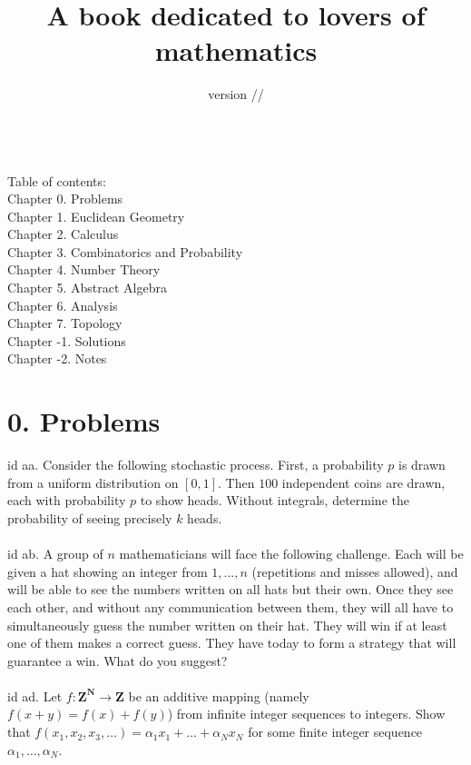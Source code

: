 \documentclass[oneside]{book}
\title{A book dedicated to lovers of mathematics}
\author{}
\date{version \the\year/\the\month/\the\day}
\newcommand{\Z}{\mathbf{Z}}
\newcommand{\N}{\mathbf{N}}
\newcommand\chap[1]{%
  \chapter*{#1}%
  \addcontentsline{toc}{chapter}{#1}}
\begin{document}
\maketitle

\pagestyle{empty}
\tableofcontents

\phantom{}\\
Table of contents:  \\
Chapter 0. Problems   \\
Chapter 1. Euclidean Geometry  \\
Chapter 2. Calculus  \\
Chapter 3. Combinatorics and Probability    \\
Chapter 4. Number Theory \\
Chapter 5. Abstract Algebra    \\
Chapter 6. Analysis  \\
Chapter 7. Topology  \\
Chapter -1. Solutions   \\
Chapter -2. Notes   \\ 

\newpage
\chap{0. Problems}
id aa. Consider the following stochastic process. First, a probability $p$ is drawn from a uniform distribution on $[0,1]$. Then $100$ independent coins are drawn, each with probability $p$ to show heads. Without integrals, determine the probability of seeing precisely $k$ heads.    \\\\


id ab. A group of $n$ mathematicians will face the following challenge. Each will be given a hat showing an integer from $1,\dots,n$ (repetitions and misses allowed), and will be able to see the numbers written on all hats but their own. Once they see each other, and without any communication between them, they will all have to simultaneously guess the number written on their hat. They will win if at least one of them makes a correct guess. They have today to form a strategy that will guarantee a win. What do you suggest?   \\\\


id ad. Let $f:\Z^\N\to\Z$ be an additive mapping (namely $f(x+y)=f(x)+f(y)$) from infinite integer sequences to integers. Show that $f(x_1,x_2,x_3,\dots)=\alpha_1 x_1+\dots+\alpha_N x_N$ for some finite integer sequence $\alpha_1,\dots,\alpha_N$.  \\\\
\end{document}
